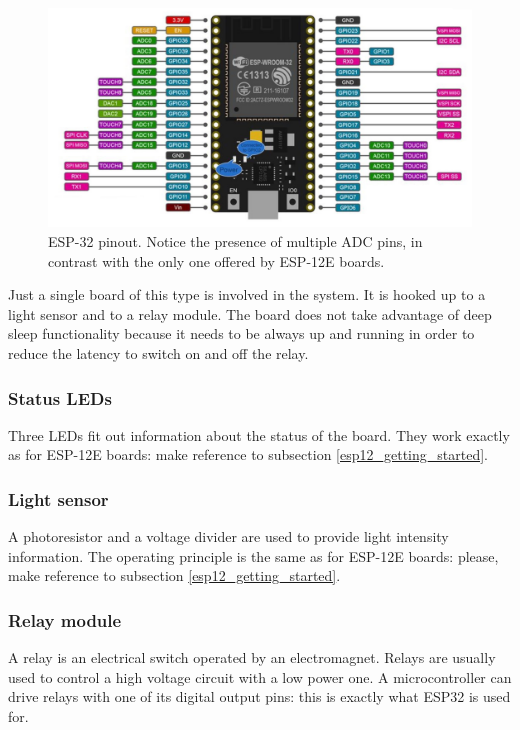 \begin{figure}[H]
	\begin{center}
		\includegraphics[width=\textwidth]{./pictures/ESP-32_pinout.JPG}
		\caption{ESP-32 pinout. Notice the presence of multiple ADC pins, in contrast with the only one offered by ESP-12E boards.}
		\label{esp32_pinout}
	\end{center}
\end{figure}

\noindent
Just a single board of this type is involved in the system. It is hooked up to a light sensor and to a relay module. The board does not take advantage of deep sleep functionality because it needs to be always up and running in order to reduce the latency to switch on and off the relay.

\subsubsection{Status LEDs}
Three LEDs fit out information about the status of the board. They work exactly as for ESP-12E boards: make reference to subsection \ref{esp12_getting_started}.

\subsubsection{Light sensor}
A photoresistor and a voltage divider are used to provide light intensity information. The operating principle is the same as for ESP-12E boards: please, make reference to subsection \ref{esp12_getting_started}.

\subsubsection{Relay module}
A relay is an electrical switch operated by an electromagnet. Relays are usually used to control a high voltage circuit with a low power one. A microcontroller can drive relays with one of its digital output pins: this is exactly what ESP32 is used for.

